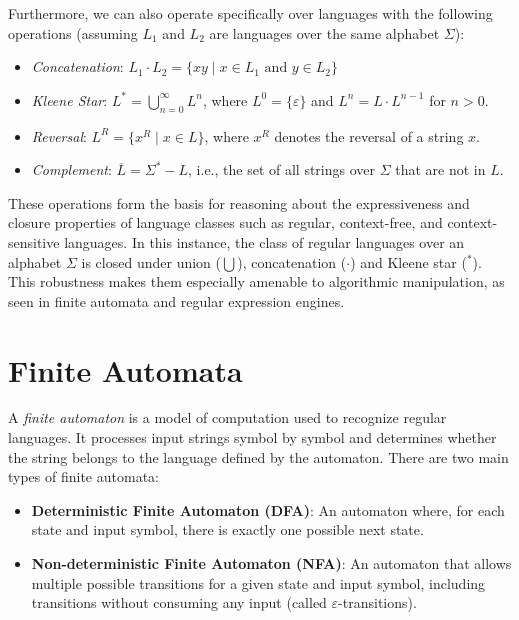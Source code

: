 Furthermore, we can also operate specifically over languages with the following operations (assuming $L_1$ and $L_2$ are languages over the same alphabet $\Sigma$):

\begin{itemize}
	\item \emph{Concatenation}: $L_1 \cdot L_2 = \{ xy \mid x \in L_1 \text{ and } y \in L_2 \}$
	\item \emph{Kleene Star}: $L^* = \bigcup_{n=0}^{\infty} L^n$, where $L^0 = \{\varepsilon\}$ and $L^n = L \cdot L^{n-1}$ for $n > 0$.
	\item \emph{Reversal}: $L^R = \{ x^R \mid x \in L \}$, where $x^R$ denotes the reversal of a string $x$.
	\item \emph{Complement}: $\overline{L} = \Sigma^* - L$, i.e., the set of all strings over $\Sigma$ that are not in $L$.
\end{itemize}

These operations form the basis for reasoning about the expressiveness and closure properties of language classes such as regular, context-free, and context-sensitive languages.
In this instance, the class of regular languages over an alphabet $\Sigma$ is closed under union ($\bigcup$), concatenation ($\cdot$) and Kleene star ($^*$).
This robustness makes them especially amenable to algorithmic manipulation, as seen in finite automata and regular expression engines.

\section{Finite Automata}
A \emph{finite automaton} is a model of computation used to recognize regular languages. It processes input strings symbol by symbol and determines whether the string belongs to the language defined by the automaton. There are two main types of finite automata:

\begin{itemize}
    \item \textbf{Deterministic Finite Automaton (DFA)}: An automaton where, for each state and input symbol, there is exactly one possible next state.
    \item \textbf{Non-deterministic Finite Automaton (NFA)}: An automaton that allows multiple possible transitions for a given state and input symbol, including transitions without consuming any input (called $\varepsilon$-transitions).
\end{itemize}

